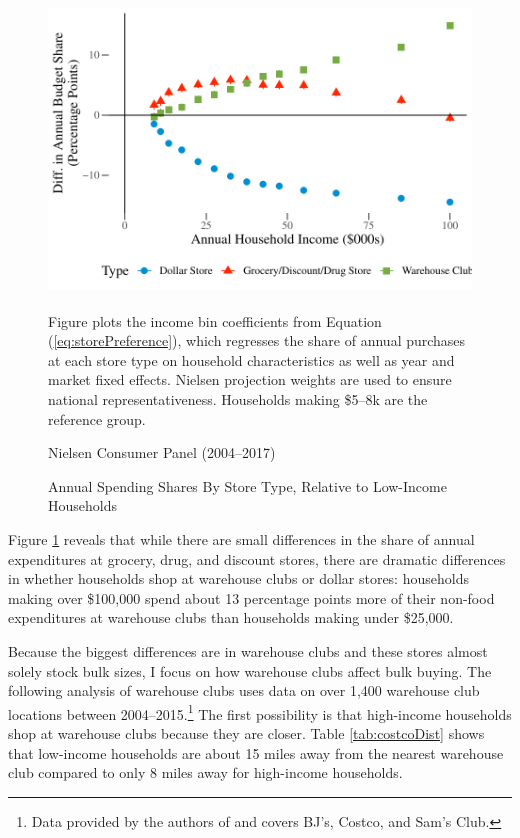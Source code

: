 \documentclass[AER]{AEA_mal}
\begin{document}
\begin{figure}[!htb]
\centering
\caption{Annual Spending Shares By Store Type, Relative to Low-Income Households}
\includegraphics[width = 5in, height = 3in]{../5_figures/expendituresByChannelColor.pdf}
\begin{figurenotes}
Figure plots the income bin coefficients from Equation (\ref{eq:storePreference}), which regresses the share of annual purchases at each store type on household characteristics as well as year and market fixed effects. Nielsen projection weights are used to ensure national representativeness. Households making \$5--8k are the reference group.
\end{figurenotes}
\begin{figurenotes}[Source]
Nielsen Consumer Panel (2004--2017)
\end{figurenotes}
\label{fig:expendituresByChannel}
\end{figure}

Figure \ref{fig:expendituresByChannel} reveals that while there are small differences in the share of annual expenditures at grocery, drug, and discount stores, there are dramatic differences in whether households shop at warehouse clubs or dollar stores: households making over \$100,000 spend about 13 percentage points more of their non-food expenditures at warehouse clubs than households making under \$25,000.

Because the biggest differences are in warehouse clubs and these stores almost solely stock bulk sizes, I focus on how warehouse clubs affect bulk buying. The following analysis of warehouse clubs uses data on over 1,400 warehouse club locations between 2004--2015.\footnote{Data provided by the authors of \citet{coibion2017} and covers BJ's, Costco, and Sam's Club.} The first possibility is that high-income households shop at warehouse clubs because they are closer. Table \ref{tab:costcoDist} shows that low-income households are about 15 miles away from the nearest warehouse club compared to only 8 miles away for high-income households.
\end{document}
